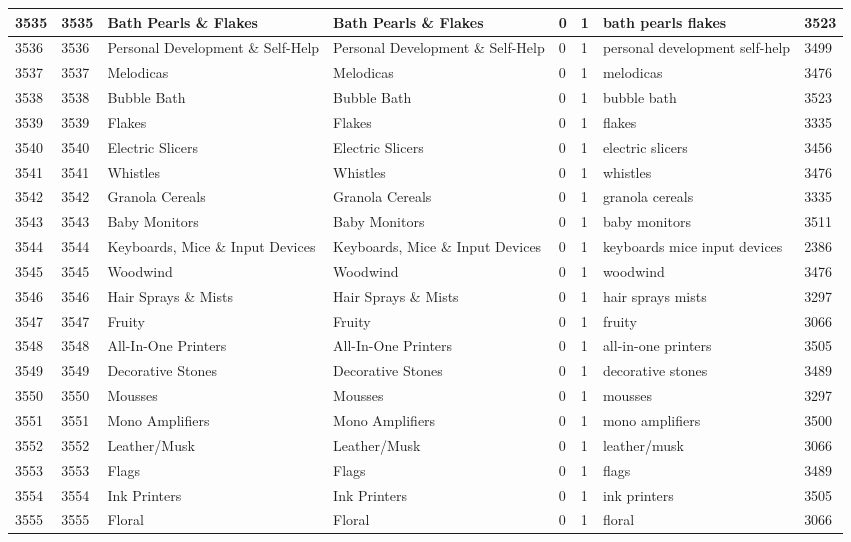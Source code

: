 \begin{longtable}{|l|l|l|l|l|l|l|l|}
3535 & 3535 & Bath Pearls \& Flakes & Bath Pearls \& Flakes & 0 & 1 & bath pearls flakes & 3523 \\ \hline 
3536 & 3536 & Personal Development \& Self-Help & Personal Development \& Self-Help & 0 & 1 & personal development self-help & 3499 \\ \hline 
3537 & 3537 & Melodicas & Melodicas & 0 & 1 & melodicas & 3476 \\ \hline 
3538 & 3538 & Bubble Bath & Bubble Bath & 0 & 1 & bubble bath & 3523 \\ \hline 
3539 & 3539 & Flakes & Flakes & 0 & 1 & flakes & 3335 \\ \hline 
3540 & 3540 & Electric Slicers & Electric Slicers & 0 & 1 & electric slicers & 3456 \\ \hline 
3541 & 3541 & Whistles & Whistles & 0 & 1 & whistles & 3476 \\ \hline 
3542 & 3542 & Granola Cereals & Granola Cereals & 0 & 1 & granola cereals & 3335 \\ \hline 
3543 & 3543 & Baby Monitors & Baby Monitors & 0 & 1 & baby monitors & 3511 \\ \hline 
3544 & 3544 & Keyboards, Mice \& Input Devices & Keyboards, Mice \& Input Devices & 0 & 1 & keyboards mice input devices & 2386 \\ \hline 
3545 & 3545 & Woodwind & Woodwind & 0 & 1 & woodwind & 3476 \\ \hline 
3546 & 3546 & Hair Sprays \& Mists & Hair Sprays \& Mists & 0 & 1 & hair sprays mists & 3297 \\ \hline 
3547 & 3547 & Fruity & Fruity & 0 & 1 & fruity & 3066 \\ \hline 
3548 & 3548 & All-In-One Printers & All-In-One Printers & 0 & 1 & all-in-one printers & 3505 \\ \hline 
3549 & 3549 & Decorative Stones & Decorative Stones & 0 & 1 & decorative stones & 3489 \\ \hline 
3550 & 3550 & Mousses & Mousses & 0 & 1 & mousses & 3297 \\ \hline 
3551 & 3551 & Mono Amplifiers & Mono Amplifiers & 0 & 1 & mono amplifiers & 3500 \\ \hline 
3552 & 3552 & Leather/Musk & Leather/Musk & 0 & 1 & leather/musk & 3066 \\ \hline 
3553 & 3553 & Flags & Flags & 0 & 1 & flags & 3489 \\ \hline 
3554 & 3554 & Ink Printers & Ink Printers & 0 & 1 & ink printers & 3505 \\ \hline 
3555 & 3555 & Floral & Floral & 0 & 1 & floral & 3066 \\ \hline 

\end{longtable}

